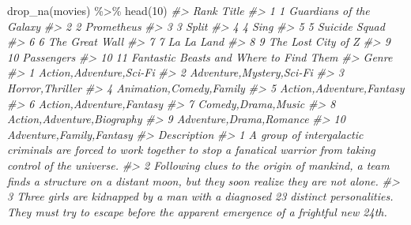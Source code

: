 \documentclass[
]{book}
\newenvironment{Shaded}{\begin{snugshade}}{\end{snugshade}}
\newcommand{\CommentTok}[1]{\textcolor[rgb]{0.56,0.35,0.01}{\textit{#1}}}
\newcommand{\DecValTok}[1]{\textcolor[rgb]{0.00,0.00,0.81}{#1}}
\newcommand{\FunctionTok}[1]{\textcolor[rgb]{0.00,0.00,0.00}{#1}}
\newcommand{\NormalTok}[1]{#1}
\newcommand{\SpecialCharTok}[1]{\textcolor[rgb]{0.00,0.00,0.00}{#1}}
\begin{document}
\begin{Shaded}
\begin{Highlighting}[]
\FunctionTok{drop\_na}\NormalTok{(movies) }\SpecialCharTok{\%\textgreater{}\%}
\FunctionTok{head}\NormalTok{(}\DecValTok{10}\NormalTok{)}
\CommentTok{\#\textgreater{}    Rank                                   Title}
\CommentTok{\#\textgreater{} 1     1                 Guardians of the Galaxy}
\CommentTok{\#\textgreater{} 2     2                              Prometheus}
\CommentTok{\#\textgreater{} 3     3                                   Split}
\CommentTok{\#\textgreater{} 4     4                                    Sing}
\CommentTok{\#\textgreater{} 5     5                           Suicide Squad}
\CommentTok{\#\textgreater{} 6     6                          The Great Wall}
\CommentTok{\#\textgreater{} 7     7                              La La Land}
\CommentTok{\#\textgreater{} 8     9                      The Lost City of Z}
\CommentTok{\#\textgreater{} 9    10                              Passengers}
\CommentTok{\#\textgreater{} 10   11 Fantastic Beasts and Where to Find Them}
\CommentTok{\#\textgreater{}                         Genre}
\CommentTok{\#\textgreater{} 1     Action,Adventure,Sci{-}Fi}
\CommentTok{\#\textgreater{} 2    Adventure,Mystery,Sci{-}Fi}
\CommentTok{\#\textgreater{} 3             Horror,Thriller}
\CommentTok{\#\textgreater{} 4     Animation,Comedy,Family}
\CommentTok{\#\textgreater{} 5    Action,Adventure,Fantasy}
\CommentTok{\#\textgreater{} 6    Action,Adventure,Fantasy}
\CommentTok{\#\textgreater{} 7          Comedy,Drama,Music}
\CommentTok{\#\textgreater{} 8  Action,Adventure,Biography}
\CommentTok{\#\textgreater{} 9     Adventure,Drama,Romance}
\CommentTok{\#\textgreater{} 10   Adventure,Family,Fantasy}
\CommentTok{\#\textgreater{}                                                                                                                                                                                                                       Description}
\CommentTok{\#\textgreater{} 1                                                                                                 A group of intergalactic criminals are forced to work together to stop a fanatical warrior from taking control of the universe.}
\CommentTok{\#\textgreater{} 2                                                                                                 Following clues to the origin of mankind, a team finds a structure on a distant moon, but they soon realize they are not alone.}
\CommentTok{\#\textgreater{} 3                                                                   Three girls are kidnapped by a man with a diagnosed 23 distinct personalities. They must try to escape before the apparent emergence of a frightful new 24th.}

\end{Highlighting}
\end{Shaded}
\end{document}
